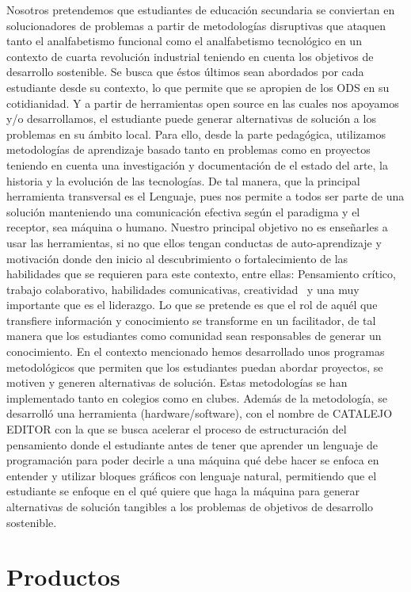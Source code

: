 Nosotros pretendemos que estudiantes de educación secundaria se conviertan en solucionadores de problemas a partir de metodologías disruptivas
que ataquen tanto el analfabetismo funcional como el analfabetismo tecnológico en un contexto de cuarta revolución industrial teniendo en
cuenta los objetivos de desarrollo sostenible. Se busca que éstos últimos sean abordados por cada estudiante desde su contexto, lo que
permite que se apropien de los ODS en su cotidianidad. Y a partir de herramientas open source en las cuales nos apoyamos y/o desarrollamos,
el estudiante puede generar alternativas de solución a los problemas en su ámbito local.
Para ello, desde la parte pedagógica, utilizamos metodologías de aprendizaje basado tanto en problemas como en proyectos teniendo en cuenta una
investigación y documentación de el estado del arte, la historia y la evolución de las tecnologías. De tal manera, que la principal herramienta
transversal es el Lenguaje, pues nos permite a todos ser parte de una solución manteniendo una comunicación efectiva según el paradigma y el
receptor, sea máquina o humano.
Nuestro principal objetivo no es enseñarles a usar las herramientas, si no que ellos tengan conductas de auto-aprendizaje y motivación donde 
den inicio al descubrimiento o fortalecimiento de las habilidades que se requieren para este contexto, entre ellas: Pensamiento crítico,
trabajo colaborativo, habilidades comunicativas, creatividad  y una muy importante que es el liderazgo. Lo que se pretende es que el rol de
aquél que transfiere información y conocimiento se transforme en un facilitador, de tal manera que los estudiantes como comunidad sean
responsables de generar un conocimiento.
En el contexto mencionado hemos desarrollado unos programas metodológicos que permiten que los estudiantes puedan abordar proyectos,
se motiven y generen alternativas de solución. Estas metodologías se han implementado tanto en colegios como en clubes. Además de la
metodología, se desarrolló una herramienta (hardware/software), con el nombre de CATALEJO EDITOR con la que se busca acelerar el proceso
de estructuración del pensamiento donde el estudiante antes de tener que aprender un lenguaje de programación para poder decirle a una
máquina qué debe hacer se enfoca en entender y utilizar bloques gráficos con lenguaje natural, permitiendo que el estudiante se enfoque
en el qué quiere que haga la máquina para generar alternativas de solución tangibles a los problemas de objetivos de desarrollo sostenible.

\section*{Productos}

